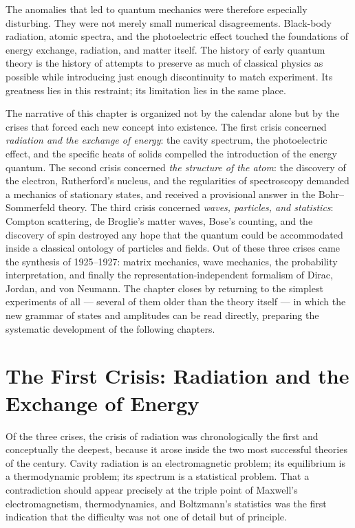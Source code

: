 The anomalies that led to quantum mechanics were therefore especially disturbing. They were not merely small numerical disagreements. Black-body radiation, atomic spectra, and the photoelectric effect touched the foundations of energy exchange, radiation, and matter itself. The history of early quantum theory is the history of attempts to preserve as much of classical physics as possible while introducing just enough discontinuity to match experiment. Its greatness lies in this restraint; its limitation lies in the same place.

The narrative of this chapter is organized not by the calendar alone but by the crises that forced each new concept into existence. The first crisis concerned \emph{radiation and the exchange of energy}: the cavity spectrum, the photoelectric effect, and the specific heats of solids compelled the introduction of the energy quantum. The second crisis concerned \emph{the structure of the atom}: the discovery of the electron, Rutherford's nucleus, and the regularities of spectroscopy demanded a mechanics of stationary states, and received a provisional answer in the Bohr--Sommerfeld theory. The third crisis concerned \emph{waves, particles, and statistics}: Compton scattering, de Broglie's matter waves, Bose's counting, and the discovery of spin destroyed any hope that the quantum could be accommodated inside a classical ontology of particles and fields. Out of these three crises came the synthesis of 1925--1927: matrix mechanics, wave mechanics, the probability interpretation, and finally the representation-independent formalism of Dirac, Jordan, and von Neumann. The chapter closes by returning to the simplest experiments of all --- several of them older than the theory itself --- in which the new grammar of states and amplitudes can be read directly, preparing the systematic development of the following chapters.

\section{The First Crisis: Radiation and the Exchange of Energy}
Of the three crises, the crisis of radiation was chronologically the first and conceptually the deepest, because it arose inside the two most successful theories of the century. Cavity radiation is an electromagnetic problem; its equilibrium is a thermodynamic problem; its spectrum is a statistical problem. That a contradiction should appear precisely at the triple point of Maxwell's electromagnetism, thermodynamics, and Boltzmann's statistics was the first indication that the difficulty was not one of detail but of principle.

